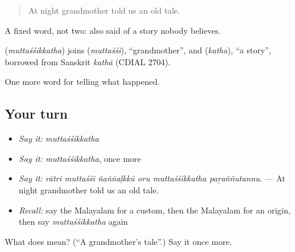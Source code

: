 \begin{quote}
At night grandmother told us an old tale.
\end{quote}

A fixed word, not two: also said of a story nobody believes.

\begin{cousinweb}
\textbf{} (\emph{muttaśśikkatha}) joins  (\emph{muttaśśi}), \textquotedblleft{}grandmother\textquotedblright{}, and  (\emph{katha}), \textquotedblleft{}a story\textquotedblright{}, borrowed from Sanskrit \emph{kathā} (CDIAL 2704).
\end{cousinweb}

\begin{grammarlens}[title={What you've built}]
One more word for telling what happened.
\end{grammarlens}

\subsection*{Your turn}
\begin{itemize}
\raggedright
  \item \emph{Say it:} \emph{muttaśśikkatha}
  \item \emph{Say it:} \emph{muttaśśikkatha}, once more
  \item \emph{Say it:} \emph{rātri muttaśśi ñaṅṅaḷkkŭ oru muttaśśikkatha paṟaññutannu.} — At night grandmother told us an old tale.
  \item \emph{Recall:} say the Malayalam for a custom, then the Malayalam for an origin, then say \emph{muttaśśikkatha} again
\end{itemize}

\begin{tcolorbox}[breakable,colback=teal!4,colframe=teal!35!black,title={Before you move on}]
What does  mean? (\textquotedblleft{}A grandmother's tale\textquotedblright{}.) Say it once more.
\end{tcolorbox}
